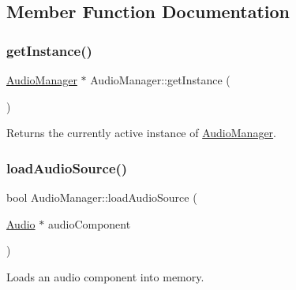 \subsection{Member Function Documentation}
\hypertarget{class_mason_1_1_audio_manager_a77de22887544ce37ae13d7c4d5cf7a79}{}\label{class_mason_1_1_audio_manager_a77de22887544ce37ae13d7c4d5cf7a79} 
\subsubsection{\texorpdfstring{get\+Instance()}{getInstance()}}
{\footnotesize\ttfamily \hyperlink{class_mason_1_1_audio_manager}{Audio\+Manager} $\ast$ Audio\+Manager\+::get\+Instance (\begin{DoxyParamCaption}{ }\end{DoxyParamCaption})\hspace{0.3cm}{\ttfamily [static]}}



Returns the currently active instance of \hyperlink{class_mason_1_1_audio_manager}{Audio\+Manager}. 

\hypertarget{class_mason_1_1_audio_manager_ae8264e1149615ee5b3cc54317bd0fe4a}{}\label{class_mason_1_1_audio_manager_ae8264e1149615ee5b3cc54317bd0fe4a} 
\subsubsection{\texorpdfstring{load\+Audio\+Source()}{loadAudioSource()}}
{\footnotesize\ttfamily bool Audio\+Manager\+::load\+Audio\+Source (\begin{DoxyParamCaption}\item[{\hyperlink{class_mason_1_1_audio}{Audio} $\ast$}]{audio\+Component }\end{DoxyParamCaption})}



Loads an audio component into memory. 

\hypertarget{class_mason_1_1_audio_manager_a061109c8b24705aa7ed1a5c28b9a4cd1}{}\label{class_mason_1_1_audio_manager_a061109c8b24705aa7ed1a5c28b9a4cd1} 
